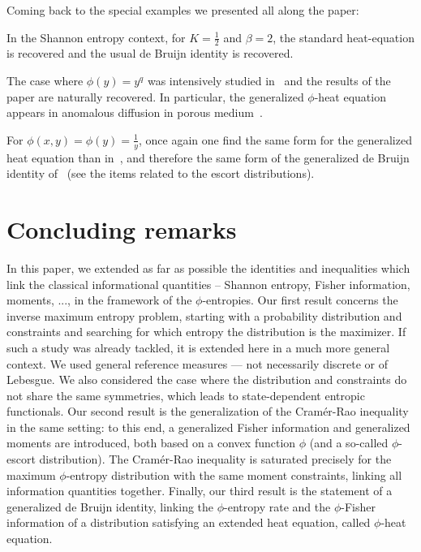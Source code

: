\documentclass[entropy,article,submit,moreauthors,pdftex]{Definitions/mdpi}
\newcounter{GaussExample}%
\newcounter{qGaussExample}%
\newcounter{arcsineExample}%
\begin{document}
Coming back to the special examples we presented all along the paper:
%
\begin{Example}
  In  the Shannon  entropy context,  for  $K =  \frac12$  and $\beta  = 2$,  the
  standard  heat-equation is  recovered  and  the usual  de  Bruijn identity  is
  recovered.
\end{Example}
%
\begin{Example}
  The case where $\phi(y) =  y^q$ was intensively studied in~\cite{Ber13:08} and
  the  results  of  the  paper  are naturally  recovered.   In  particular,  the
  generalized  $\phi$-heat equation  appears  in anomalous  diffusion in  porous
  medium~\cite{TsaLen02, Ber13:08, Vaz06, GilKer04, Rou05}.
\end{Example}
%
\begin{Example}
  For $\phi(x,y) = \phi(y) = \frac{1}{y}$, once again one find the same form for
  the generalized  heat equation  than in~\cite{TsaLen02, Ber13:08,  Vaz06}, and
  therefore   the   same   form   of  the   generalized   de   Bruijn   identity
  of~\cite{Ber13:08} (see the items related to the escort distributions).
\end{Example}




\section{Concluding remarks}
\label{sec:Conclusion}

In this  paper, we extended as  far as possible the  identities and inequalities
which link  the classical  informational quantities  -- Shannon  entropy, Fisher
information, moments, ...,  in the framework of the  $\phi$-entropies. Our first
result concerns the inverse maximum entropy problem, starting with a probability
distribution and constraints and searching for which entropy the distribution is
the maximizer.  If  such a study was  already tackled, it is extended  here in a
much  more  general  context.   We  used  general  reference  measures  ---  not
necessarily discrete  or of  Lebesgue.  We  also considered  the case  where the
distribution and  constraints do not share  the same symmetries, which  leads to
state-dependent entropic  functionals.  Our second result  is the generalization
of the Cram\'er-Rao  inequality in the same setting: to  this end, a generalized
Fisher  information and  generalized moments  are  introduced, both  based on  a
convex  function  $\phi$  (and  a so-called  $\phi$-escort  distribution).   The
Cram\'er-Rao inequality  is saturated  precisely for the  maximum $\phi$-entropy
distribution  with   the  same  moment  constraints,   linking  all  information
quantities  together.   Finally,  our  third   result  is  the  statement  of  a
generalized  de  Bruijn  identity,  linking  the  $\phi$-entropy  rate  and  the
$\phi$-Fisher  information  of  a   distribution  satisfying  an  extended  heat
equation, called $\phi$-heat equation.
\end{document}
